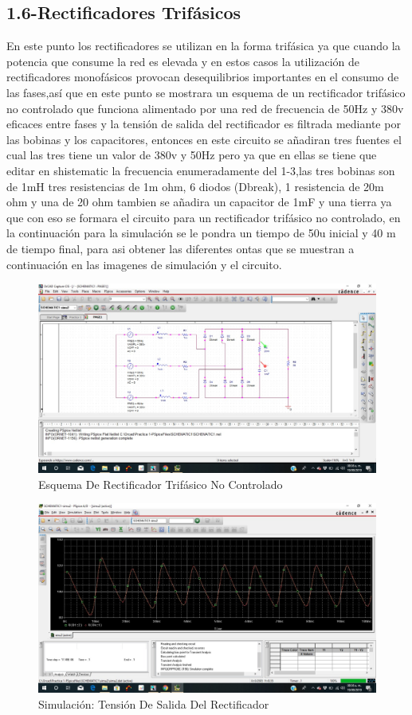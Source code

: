 \documentclass[10pt,a4paper]{article}
\begin{document}
\subsection{1.6-Rectificadores Trifásicos}
En este punto los rectificadores se utilizan en la forma trifásica ya que cuando la potencia que consume la red es elevada y en estos casos la utilización de rectificadores monofásicos provocan desequilibrios importantes en el consumo de las fases,así que en este punto se mostrara un esquema de un rectificador trifásico no controlado que funciona alimentado por una red de frecuencia de 50Hz y 380v eficaces entre fases y la tensión de salida del rectificador es filtrada mediante por las bobinas y los capacitores, entonces en este circuito se añadiran tres fuentes el cual las tres tiene un valor de 380v y 50Hz pero ya que en ellas se tiene que editar en shistematic la frecuencia enumeradamente del 1-3,las tres bobinas son de 1mH tres resistencias de 1m ohm, 6 diodos (Dbreak), 1 resistencia de 20m ohm y una de 20 ohm tambien se añadira un capacitor de 1mF y una tierra ya que con eso se formara el circuito para un rectificador trifásico no controlado, en la continuación para la simulación se le pondra un tiempo de 50u inicial y 40 m de tiempo final, para asi obtener las diferentes ontas que se muestran a continuación en las imagenes de simulación y el circuito.
\begin{figure}[hbtp]
\centering
\includegraphics[scale=0.3]{06.jpeg}
\caption{Esquema De Rectificador Trifásico No Controlado}
\end{figure}
\begin{figure}[hbtp]
\centering
\includegraphics[scale=0.3]{6.jpeg}
\caption{Simulación: Tensión De Salida Del Rectificador}
\end{figure}
\end{document}
